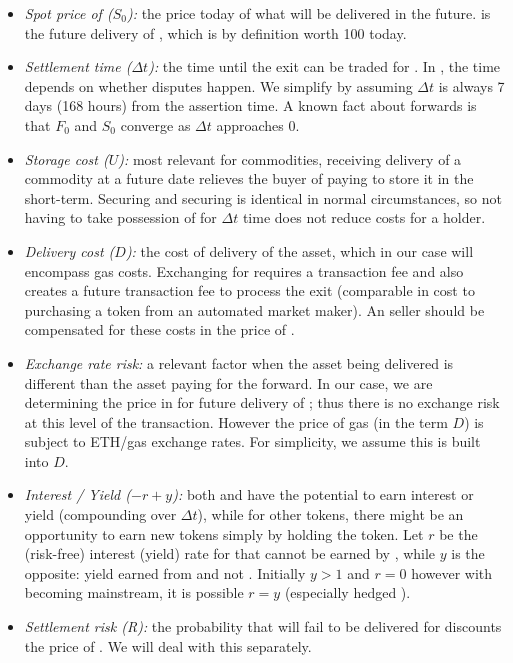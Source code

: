 \begin{itemize}
\item \textit{Spot price of \ethone ($S_0$):} the price today of what will be delivered in the future. \ethxx is the future delivery of \ethone, which is by definition worth 100 \ethone today. 
\item \textit{Settlement time ($\Delta t$):} the time until the exit can be traded for \ethone. In \arb, the time depends on whether disputes happen. We simplify by assuming $\Delta t$ is always 7 days (168 hours) from the assertion time. A known fact about forwards is that $F_0$ and $S_0$ converge as $\Delta t$ approaches 0. 
\item \textit{Storage cost ($U$):} most relevant for commodities, receiving delivery of a commodity at a future date relieves the buyer of paying to store it in the short-term. Securing \ethxx and securing \ethone is identical in normal circumstances, so not having to take possession of \ethone for $\Delta t$ time does not reduce costs for a \ethxx holder. 
\item \textit{Delivery cost ($D$):} the cost of delivery of the asset, which in our case will encompass gas costs. Exchanging \ethone for \ethxx requires a transaction fee and also creates a future transaction fee to process the exit (comparable in cost to purchasing a token from an automated market maker). An \ethone seller should be compensated for these costs in the price of \ethxx.
\item \textit{Exchange rate risk:} a relevant factor when the asset being delivered is different than the asset paying for the forward. In our case, we are determining the price in \ethone for future delivery of \ethone; thus there is no exchange risk at this level of the transaction. However the price of gas (in the term $D$) is subject to ETH/gas exchange rates. For simplicity, we assume this is built into $D$.
\item \textit{Interest / Yield ($-r+y$):} both \ethone and \ethxx have the potential to earn interest or yield (compounding over $\Delta t$), while for other tokens, there might be an opportunity to earn new tokens simply by holding the token. Let $r$ be the (risk-free) interest (yield) rate for \ethone that cannot be earned by \ethxx, while $y$ is the opposite: yield earned from \ethxx and not \ethone. Initially $y>1$ and $r=0$ however with \ethxx becoming mainstream, it is possible $r=y$ (especially hedged \ethxx). 
\item \textit{Settlement risk (R):} the probability that \ethone will fail to be delivered for \ethxx discounts the price of \ethxx. We will deal with this separately.

\end{itemize}


